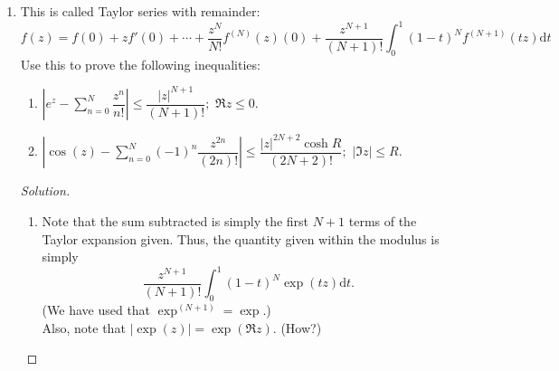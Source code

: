 \documentclass[12pt]{article}
\theoremstyle{definition}
\newenvironment{soln}{\begin{proof}[Solution]}{\end{proof}}
\begin{document}
\begin{enumerate}
\begin{soln}
		Our aim will be to show that $f^{(k)}(0)$ is real for all $k \in \mathbb{N}\cup\{0\}.$ The conclusion will then follow since we know that the coefficients are given by $f^{(k)}(0)/k!.$

		In the following, it will be assumed that $x$ and $x_0$ are real and within the (open) disc of convergence.

		First, we make the conclusion for real $x$ that
		\begin{equation*} 
			f(x) = f(\bar{x}) = \overline{f(x)}.
		\end{equation*}

		That is, $f(x)$ is real whenever $x$ is real. We now wish to show that this is true for all higher derivatives as well. That is, $f^{(k)}(x)$ is real for real $x$ for all $k \ge 1.$ It suffices to show that it is true for $f'.$ \hfill (Why? Induct!)

		Since we know that $f'$ exists within the disc, we may compute the limit along the real axis. Fix a real $x_0$ within the disc and note that
		\begin{equation*} 
			f'(x_0) = \lim_{\substack{x\to x_0\\x\in\mathbb{R}}}\dfrac{f(x) - f(x_0)}{x - x_0}.
		\end{equation*}
		Since the expression within the limit is the quotient of two purely real expressions, we see that the limit $f'(x_0)$ is real.

		Thus, we are done.
	\end{soln}
	\emph{Remark.} Note that we knew that all the higher derivatives of $f$ do exist. Thus, we can reply the inductive process by just computing the limit along the real axis.
	\item This is called Taylor series with remainder:
	\begin{equation*} 
		f(z) = f(0) + zf'(0) + \cdots + \dfrac{z^N}{N!}f^{(N)}(z)(0) + \dfrac{z^{N+1}}{(N + 1)!}\int_{0}^{1} (1 - t)^Nf^{(N+1)}(tz){\mathrm{d}}t
	\end{equation*}
	Use this to prove the following inequalities:
	\begin{enumerate}
		\item $\left|e^z - \displaystyle\sum_{n=0}^{N}\dfrac{z^n}{n!}\right| \le \dfrac{|z|^{N+1}}{(N + 1)!};$ $\Re z \le 0.$
		\item $\left|\cos(z) - \displaystyle\sum_{n=0}^{N}(-1)^n\dfrac{z^{2n}}{(2n)!}\right| \le \dfrac{|z|^{2N+2}\cosh R}{(2N + 2)!};$ $\left|\Im z\right| \le R.$
	\end{enumerate}
	\begin{soln}
		\begin{enumerate}
			\item Note that the sum subtracted is simply the first $N + 1$ terms of the Taylor expansion given. Thus, the quantity given within the modulus is simply
			\begin{equation*} 
				\dfrac{z^{N+1}}{(N + 1)!}\int_{0}^{1} (1 - t)^N\exp(tz){\mathrm{d}}t.
			\end{equation*}
			(We have used that $\exp^{(N+1)} = \exp.$)\\
			Also, note that $\left|\exp(z)\right| = \exp(\Re z).$ \hfill (How?)


\end{enumerate}
\end{soln}
\end{enumerate}
\end{document}
